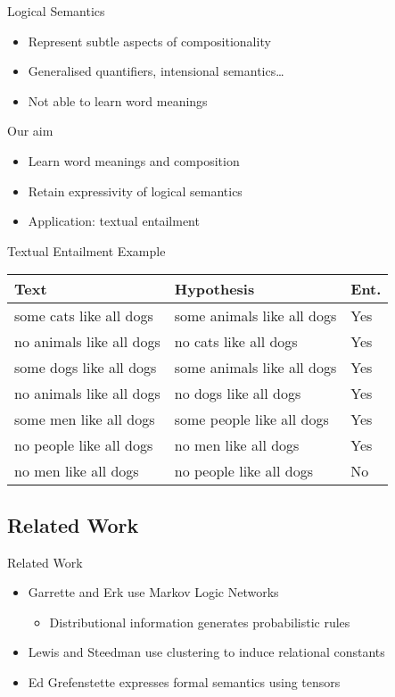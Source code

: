 \documentclass{beamer}
\newlength{\wideitemsep}
\let\olditem\item
\renewcommand{\item}{\setlength{\itemsep}{\wideitemsep}\olditem}
\begin{document}
\begin{frame}{Logical Semantics}
\begin{itemize}
\item Represent subtle aspects of compositionality
\item Generalised quantifiers, intensional semantics\ldots
\item Not able to learn word meanings
\end{itemize}
\end{frame}

\begin{frame}{Our aim}
\begin{itemize}
\item Learn word meanings and composition
\item Retain expressivity of logical semantics
\item Application: textual entailment
\end{itemize}
\end{frame}

\begin{frame}{Textual Entailment Example}
\begin{tabular}{|l|l|l|}
\hline
Text & Hypothesis & Ent.\\
\hline
some cats like all dogs & some animals like all dogs & Yes\\
no animals like all dogs & no cats like all dogs & Yes\\
some dogs like all dogs & some animals like all dogs & Yes\\
no animals like all dogs & no dogs like all dogs & Yes\\
some men like all dogs & some people like all dogs & Yes\\
\hline
no people like all dogs & no men like all dogs & Yes\\
no men like all dogs & no people like all dogs & No\\
\hline
\end{tabular}
\end{frame}

\subsection{Related Work}

\begin{frame}{Related Work}
\begin{itemize}
\item Garrette and Erk use Markov Logic Networks
\begin{itemize}
\item Distributional information generates probabilistic rules
\end{itemize}
\item Lewis and Steedman use clustering to induce relational constants
\item Ed Grefenstette expresses formal semantics using tensors
\end{itemize}
\end{frame}
\end{document}
